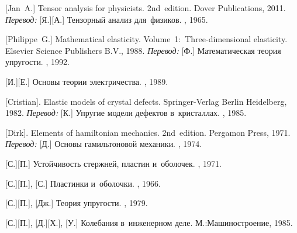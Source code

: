 \begin{thebibliography}{123}
\begin{otherlanguage}{russian}
[Jan~A.] Tensor analysis for physicists. 2nd~edition. Dover Publications, 2011. 
\emph{Перевод:} [Я.][А.] Тензорный анализ для~физиков. \naukapublisher, 1965. 

[Philippe~G.] Mathematical elasticity. Volume~1:~Three\hbox{-}di\-men\-sion\-al elasticity. Elsevier Science Publishers B.\hspace{.1ex}V., 1988.  %
\emph{Перевод:} [Ф.] Математическая теория упругости. \mirpublisher, 1992. 

[И.][Е.] Основы теории электричества. \naukapublisher, 1989. 

[Cristian]. Elastic models of crystal defects. Springer\hbox{-}Verlag Berlin Heidelberg, 1982. 
\emph{Перевод:} [К.] Упругие модели дефектов в~кристаллах. \mirpublisher, 1985. 

[Dirk]. Elements of hamiltonian mechanics. 2nd~edition. Pergamon Press, 1971. 
\emph{Перевод:} [Д.] Основы гамильтоновой механики. \naukapublisher, 1974. 

[С.][П.] Устойчивость стержней, пластин и~оболочек. \naukapublisher, 1971. 

[С.][П.], [С.] Пластинки и~оболочки. \naukapublisher, 1966. 

[С.][П.], [Дж.] Теория упругости. \naukapublisher, 1979. 

[С.][П.], [Д.][Х.], [У.] Колебания в~инженерном деле. М.:\;Машино\-строение, 1985. 


\end{otherlanguage}
\end{thebibliography}
